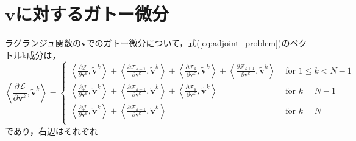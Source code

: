 \documentclass[a4paper,xelatex,ja=standard]{bxjsarticle}
\begin{document}
\newpage
\appendix
\renewcommand{\appendixname}{Appendix }
\section{$\mathbf{v}$に対するガトー微分}

ラグランジュ関数の$\mathbf{v}$でのガトー微分について，式(\ref{eq:adjoint_problem})のベクトルk成分は，
\begin{equation}
    \label{eq:adjoint_vdd}
    \left\langle\frac{\partial \mathcal{L}}{\partial \mathbf{v}^k}, \tilde{\mathbf{v}}^k\right\rangle
    = \begin{cases}
      \displaystyle \left\langle\frac{\partial \mathcal{J}}{\partial \mathbf{v}^{k}}, \tilde{\mathbf{v}}^{k}\right\rangle
      + \displaystyle \left\langle\frac{\partial \mathcal{F}_{k-1}}{\partial \mathbf{v}^{k}}, \tilde{\mathbf{v}}^{k}\right\rangle
      + \displaystyle \left\langle\frac{\partial \mathcal{F}_{k}}{\partial \mathbf{v}^{k}}, \tilde{\mathbf{v}}^{k}\right\rangle
      + \displaystyle \left\langle\frac{\partial \mathcal{F}_{k+1}}{\partial \mathbf{v}^{k}}, \tilde{\mathbf{v}}^{k}\right\rangle 
      & \text { for } 1 \leq k<N-1 \\[12pt]
      \displaystyle \left\langle\frac{\partial \mathcal{J}}{\partial \mathbf{v}^{k}}, \tilde{\mathbf{v}}^{k}\right\rangle
      + \displaystyle \left\langle\frac{\partial \mathcal{F}_{k-1}}{\partial \mathbf{v}^{k}}, \tilde{\mathbf{v}}^{k}\right\rangle
      + \displaystyle \left\langle\frac{\partial \mathcal{F}_{k}}{\partial \mathbf{v}^{k}}, \tilde{\mathbf{v}}^{k}\right\rangle
      & \text { for } k=N-1 \\[12pt]
      \displaystyle \left\langle\frac{\partial \mathcal{J}}{\partial \mathbf{v}^{k}}, \tilde{\mathbf{v}}^{k}\right\rangle
      + \displaystyle \left\langle\frac{\partial \mathcal{F}_{k-1}}{\partial \mathbf{v}^{k}}, \tilde{\mathbf{v}}^{k}\right\rangle
      & \text { for } k=N \\[12pt]
    \end{cases}
\end{equation}
であり，右辺はそれぞれ
\end{document}
